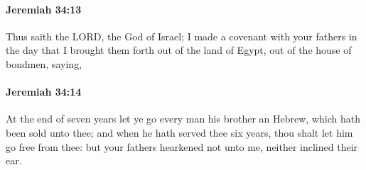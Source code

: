 		\paragraph{Jeremiah 34:13} %
			\label{JEREMIAH-34-13}

			Thus saith the LORD, the God of Israel; I made a covenant with your fathers in the day that I brought them forth out of the land of Egypt, out of the house of bondmen, saying,


		\paragraph{Jeremiah 34:14} %
			\label{JEREMIAH-34-14}

			At the end of seven years let ye go every man his brother an Hebrew, which hath been sold unto thee; and when he hath served thee six years, thou shalt let him go free from thee: but your fathers hearkened not unto me, neither inclined their ear.


